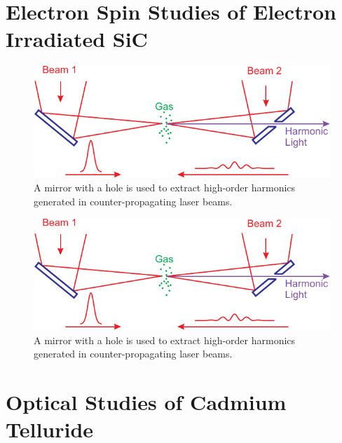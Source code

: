 \documentclass[oneside, astronomy, noacknowlegments]{BYUPhys}
\begin{document}
\begin{appendices}

\chapter{Electron Spin Studies of Electron Irradiated SiC}
\label{sec:appenda}

\begin{figure}
    \centerline{\includegraphics{Graphic1}}
    \caption[Electron-irradiated SiC lifetime  summary]{\label{fig:e17results}
     A mirror with a hole is used to extract high-order harmonics generated in
     counter-propagating laser beams.}
 \end{figure}

\begin{figure}
    \centerline{\includegraphics{Graphic1}}
    \caption[ODMR/Photoluminescence vs temperature]{\label{fig:ODMRPL}
     A mirror with a hole is used to extract high-order harmonics generated in
     counter-propagating laser beams.}
 \end{figure}

\chapter{Optical Studies of Cadmium Telluride}
\label{sec:appendb}



\end{appendices}
\end{document}
